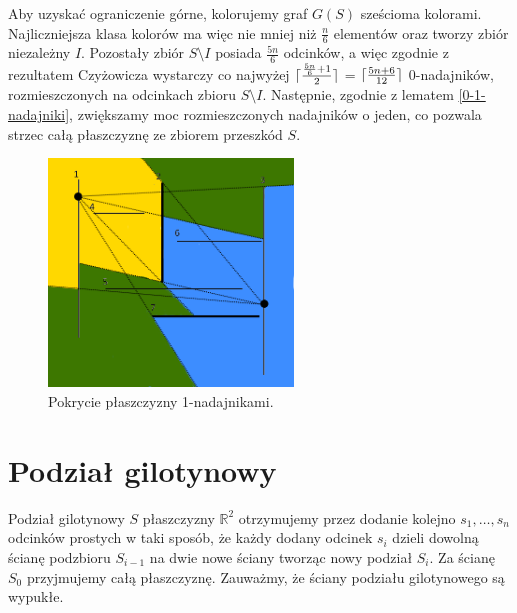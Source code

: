 \documentclass[brudnopis]{xmgr}
\DeclarePairedDelimiter\ceil{\lceil}{\rceil}
\theoremstyle{definition}
\begin{document}
\indent Aby uzyskać ograniczenie górne, kolorujemy graf $G(S)$ sześcioma kolorami. Najliczniejsza klasa kolorów ma więc nie mniej niż $\frac{n}{6}$ elementów oraz tworzy zbiór niezależny $I$. Pozostały zbiór $S \setminus I$ posiada $\frac{5n}{6}$ odcinków, a więc zgodnie z rezultatem Czyżowicza wystarczy co najwyżej $\ceil{\frac{\frac{5n}{6} + 1}{2}}$ = $\ceil{\frac{5n+6}{12}}$ 0-nadajników, rozmieszczonych na odcinkach zbioru $S \setminus I$. Następnie, zgodnie z lematem \ref{0-1-nadajniki}, zwiększamy moc rozmieszczonych nadajników o jeden, co pozwala strzec całą płaszczyznę ze zbiorem przeszkód $S$.
\begin{figure}[ht!]
  \centering
  \includegraphics[width=6.5cm]{rysunki/pokrycie_nadajnikami.png}
  \caption{Pokrycie płaszczyzny 1-nadajnikami.}
  \label{fig:pokrycie plaszczyzny}
\end{figure} 

\section{Podział gilotynowy}
Podział gilotynowy $S$ płaszczyzny $\mathbb{R}^2$ otrzymujemy przez dodanie kolejno $s_1,\ldots,s_n$ odcinków prostych w taki sposób, że każdy dodany odcinek $s_i$ dzieli dowolną ścianę podzbioru $S_{i-1}$ na dwie nowe ściany tworząc nowy podział $S_i$. Za ścianę $S_0$ przyjmujemy całą płaszczyznę. Zauważmy, że ściany podziału gilotynowego są wypukłe.
\end{document}
